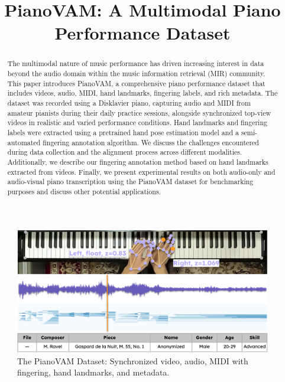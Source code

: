 \documentclass{article}
\title{PianoVAM: A Multimodal Piano Performance Dataset}
\begin{document}
\maketitle

\begin{abstract}

The multimodal nature of music performance has driven increasing interest in data beyond the audio domain within the music information retrieval (MIR) community.
This paper introduces PianoVAM, a comprehensive piano performance dataset that includes videos, audio, MIDI, hand landmarks, fingering labels, and rich metadata.
The dataset was recorded using a Disklavier piano, capturing audio and MIDI from amateur pianists during their daily practice sessions, alongside synchronized top-view videos in realistic and varied performance conditions. 
Hand landmarks and fingering labels were extracted using a pretrained hand pose estimation model and a semi-automated fingering annotation algorithm.
We discuss the challenges encountered during data collection and the alignment process across different modalities. Additionally, we describe our fingering annotation method based on hand landmarks extracted from videos.
Finally, we present experimental results on both audio-only and audio-visual piano transcription using the PianoVAM dataset for benchmarking purposes and discuss other potential applications. 

\end{abstract}

\begin{figure}
    \centering
    \includegraphics[width=1\linewidth]{Images/teaser_image.png}
    \caption{The PianoVAM Dataset: Synchronized video, audio, MIDI with fingering, hand landmarks, and metadata.}
    \label{fig:overview}
\vspace{-5mm}    
\end{figure}
\end{document}
